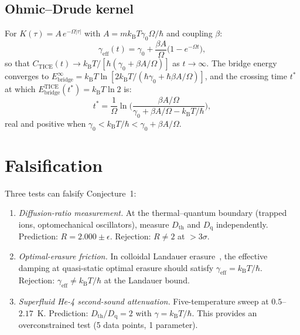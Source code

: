 \documentclass[twocolumn,showpacs,preprintnumbers,amsmath,amssymb]{revtex4-2}
\newcommand{\kB}{k_{\mathrm{B}}}
\newcommand{\Dth}{D_{\mathrm{th}}}
\newcommand{\Dq}{D_{\mathrm{q}}}
\newcommand{\geff}{\gamma_{\mathrm{eff}}}
\newcommand{\Ebr}{E_{\mathrm{bridge}}}
\newcommand{\CTICE}{C_{\mathrm{TICE}}}
\begin{document}
\subsection{Ohmic--Drude kernel}

For $K(\tau) = A\,e^{-\Omega|\tau|}$ with $A = m\kB T\gamma_0\Omega/\hbar$
and coupling $\beta$:
\begin{equation}
  \geff(t) = \gamma_0 + \frac{\beta A}{\Omega}
  \bigl(1 - e^{-\Omega t}\bigr),
\end{equation}
so that $\CTICE(t) \to \kB T/[\hbar(\gamma_0 + \beta A/\Omega)]$
as $t \to \infty$.
The bridge energy converges to
$\Ebr^\infty = \kB T\ln[2\kB T/(\hbar\gamma_0 + \hbar\beta A/\Omega)]$,
and the crossing time $t^*$ at which
$\Ebr^{\mathrm{TICE}}(t^*) = \kB T\ln 2$ is:
\begin{equation}
  t^* = \frac{1}{\Omega}\ln\!\Biggl(
  \frac{\beta A/\Omega}
  {\gamma_0 + \beta A/\Omega - \kB T/\hbar}\Biggr),
\end{equation}
real and positive when $\gamma_0 < \kB T/\hbar < \gamma_0 + \beta A/\Omega$.

\section{Falsification}

Three tests can falsify Conjecture~1:

\begin{enumerate}
\item \emph{Diffusion-ratio measurement.}
At the thermal--quantum boundary (trapped ions,
optomechanical oscillators), measure $\Dth$ and $\Dq$
independently.
Prediction: $R = 2.000 \pm \epsilon$.
Rejection: $R \neq 2$ at $>3\sigma$.

\item \emph{Optimal-erasure friction.}
In colloidal Landauer erasure~\cite{Berut2012,Jun2014},
the effective damping at quasi-static optimal erasure
should satisfy $\geff = \kB T/\hbar$.
Rejection: $\geff \neq \kB T/\hbar$ at the Landauer bound.

\item \emph{Superfluid He-4 second-sound attenuation.}
Five-temperature sweep at $0.5$--$2.17$~K.
Prediction: $\Dth/\Dq = 2$ with $\gamma = \kB T/\hbar$.
This provides an overconstrained test (5 data points,
1 parameter).
\end{enumerate}
\end{document}

